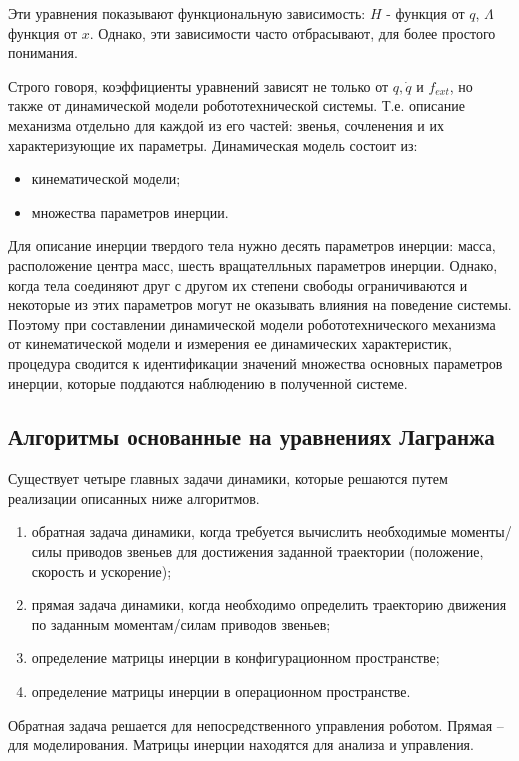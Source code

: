 Эти уравнения показывают функциональную зависимость: $H$ - функция от $q$, $\Lambda$ функция от $x$. Однако, эти зависимости часто отбрасывают, для более простого понимания. 

Строго говоря, коэффициенты уравнений зависят не только от $q, \dot q$ и $f_{ext}$, но также от динамической модели робототехнической системы.
Т.е. описание механизма отдельно для каждой из его частей: звенья, сочленения и их характеризующие их параметры. Динамическая модель состоит из:

\begin{itemize}
\item кинематической модели;
\item множества параметров инерции.
\end{itemize}

Для описание инерции твердого тела нужно десять параметров инерции: масса, расположение центра масс, шесть вращателльных параметров инерции. Однако, когда тела соединяют друг с другом их степени свободы ограничиваются и некоторые из этих параметров могут не оказывать влияния на поведение системы. Поэтому при составлении динамической модели робототехнического механизма от кинематической модели и измерения ее динамических характеристик, процедура сводится к идентификации значений множества основных параметров инерции, которые поддаются наблюдению в полученной системе.


\subsection{Алгоритмы основанные на уравнениях Лагранжа}

Существует четыре главных задачи динамики, которые решаются путем реализации описанных ниже алгоритмов. 
\begin{enumerate}
\item обратная задача динамики, когда требуется вычислить необходимые моменты/силы приводов звеньев для достижения заданной траектории (положение, скорость и ускорение);
\item прямая задача динамики, когда необходимо определить траекторию движения по заданным моментам/силам приводов звеньев;
\item определение матрицы инерции в конфигурационном пространстве;
\item определение матрицы инерции в операционном пространстве.
\end{enumerate}

Обратная задача решается для непосредственного управления роботом. Прямая -- для моделирования. Матрицы инерции находятся для анализа и управления.


